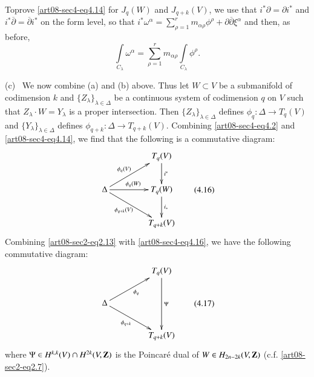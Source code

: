 \begin{remark*}
To\pageoriginale prove \eqref{art08-sec4-eq4.14} for $J_{q}(W)$ and $J_{q+k}(V)$, we use that $i^{*}\partial=\partial i^{*}$ and $i^{*}\overline{\partial}=\overline{\partial}i^{*}$ on the form level, so that $i^{*}\omega^{\alpha}=\sum\limits^{r}_{\rho=1}m_{\alpha\rho}\phi^{\rho}+\partial \overline{\partial}\xi^{\alpha}$ and then, as before,
$$
\int\limits_{C_{\lambda}}\omega^{\alpha}=\sum\limits^{r}_{\rho=1}m_{\alpha\rho}\int\limits_{C_{\lambda}}\phi^{\rho}.
$$
\end{remark*}

(c)~ We now combine (a) and (b) above. Thus let $W\subset V$ be a submanifold of codimension $k$ and $\{Z_{\lambda}\}_{\lambda\in \Delta}$ be a continuous system of codimension $q$ on $V$ such that $Z_{\lambda}\cdot W=Y_{\lambda}$ is a proper intersection. Then $\{Z_{\lambda}\}_{\lambda\in\Delta}$ defines $\phi_{q}:\Delta\to T_{q}(V)$ and $\{Y_{\lambda}\}_{\lambda\in \Delta}$ defines $\phi_{q+k}:\Delta\to T_{q+k}(V)$. Combining \eqref{art08-sec4-eq4.2} and \eqref{art08-sec4-eq4.14}, we find that the following is a commutative diagram:
\begin{equation*}
\vcenter{\xymatrix@C=1.5cm{
 & T_{q}(V)\ar[d]^-{i^{*}}\\
\Delta\ar[r]^{\phi_{q}(W)}\ar[dr]_-{\phi_{q+k}(V)}\ar[ur]^-{\phi_{q}(V)} & T_{q}(W)\ar[d]^-{i_{*}}\\
 & T_{q+k}(V)
}}\tag{4.16}\label{art08-sec4-eq4.16}
\end{equation*}
Combining \eqref{art08-sec2-eq2.13} with \eqref{art08-sec4-eq4.16}, we have the following commutative diagram:
\begin{equation*}
\vcenter{\xymatrix@C=1.5cm{
 & T_{q}(V)\ar[dd]^-{\Psi}\\
\Delta \ar[ur]_{\phi_{q}}\ar[dr]_-{\phi_{q+k}} & \\
 & T_{q+k}(V)
}}\tag{4.17}\label{art08-sec4-eq4.17}
\end{equation*}
where $\Psi\in H^{k,k}(V)\cap H^{2k}(V,\mathbf{Z})$ is the Poincar\'e dual of $W\in H_{2n-2k}(V,\mathbf{Z})$ (c.f. \eqref{art08-sec2-eq2.7}).


